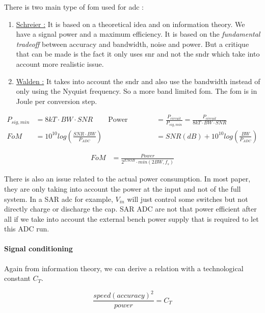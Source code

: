 \documentclass[
  a4paper,
]{article}
\begin{document}
There is two main type of {fom} used for {adc} :

\begin{enumerate}
\def\labelenumi{\arabic{enumi}.}
\item
  \ul{Schreier :} It is based on a theoretical idea and on information
  theory. We have a signal power and a maximum efficiency. It is based
  on the \emph{fundamental tradeoff} between accuracy and bandwidth,
  noise and power. But a critique that can be made is the fact it only
  uses {snr} and not the {sndr} which take into account more realistic
  issue.
\item
  \ul{Walden :} It takes into account the {sndr} and also use the
  bandwidth instead of only using the Nyquist frequency. So a more band
  limited {fom}. The {fom} is in Joule per conversion step.
\end{enumerate}

\[\begin{aligned}
        P_{sig,min} &= 8kT \cdot BW \cdot SNR & \text{Power efficiency} &= \frac{P_{circuit}}{P_{sig,min}} = \frac{P_{circuit}}{8kT \cdot BW \cdot SNR}\\
        FoM &= 10^{10} log\left( \frac{SNR\cdot BW}{P_{ADC}} \right) & &=SNR (dB) + 10^{10} log\left( \frac{BW}{P_{ADC}} \right)
\end{aligned}\]

\[\begin{aligned}
            FoM &= \frac{Power}{2^{ENOB} \cdot min(2BW,f_s)}
\end{aligned}\]

There is also an issue related to the actual power consumption. In most
paper, they are only taking into account the power at the input and not
of the full system. In a SAR {adc} for example, \(V_{in}\) will just
control some switches but not directly charge or discharge the cap. SAR
ADC are not that power efficient after all if we take into account the
external bench power supply that is required to let this ADC run.

\hypertarget{signal-conditioning}{%
\paragraph{Signal conditioning}\label{signal-conditioning}}

Again from information theory, we can derive a relation with a
technological constant \(C_T\).

\[\frac{speed (accuracy)^2}{power} = C_T\]
\end{document}
